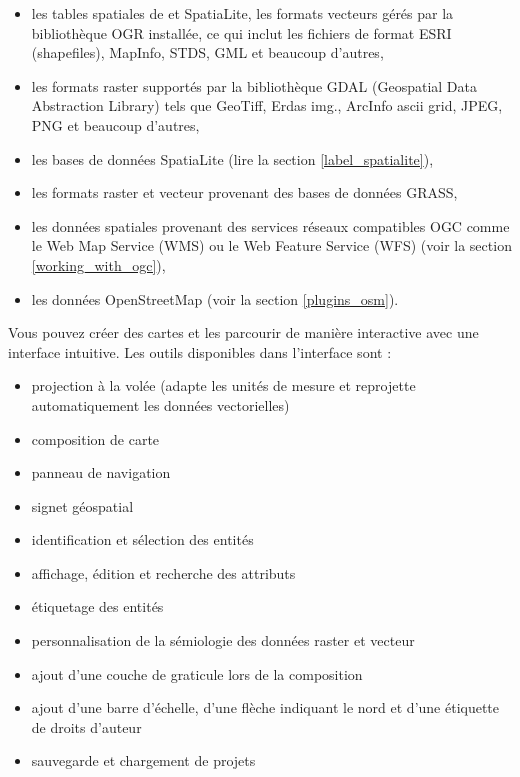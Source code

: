 \begin{itemize}[label=--]
\item les tables spatiales de \ppg et SpatiaLite, les formats vecteurs gérés par la 
bibliothèque OGR installée, ce qui inclut les fichiers de format ESRI (shapefiles),
 MapInfo, STDS, GML et beaucoup d'autres,
\item les formats raster supportés par la bibliothèque GDAL (Geospatial Data 
Abstraction Library) tels que GeoTiff, Erdas img., ArcInfo ascii grid, JPEG, 
PNG et beaucoup d'autres,
\item les bases de données SpatiaLite (lire la section \ref{label_spatialite}),
\item les formats raster et vecteur provenant des bases de données GRASS, 
\item les données spatiales provenant des services réseaux compatibles OGC 
comme le Web Map Service (WMS) ou le Web Feature Service (WFS) (voir la section 
\ref{working_with_ogc}),
\item les données OpenStreetMap (voir la section \ref{plugins_osm}).
\end{itemize}


Vous pouvez créer des cartes et les parcourir de manière interactive avec une 
interface intuitive. Les outils disponibles dans l'interface sont :

\begin{itemize}[label=--]
\item projection à la volée (adapte les unités de mesure et reprojette 
automatiquement les données vectorielles)
\item composition de carte
\item panneau de navigation
\item signet géospatial
\item identification et sélection des entités
\item affichage, édition et recherche des attributs
\item étiquetage des entités
\item personnalisation de la sémiologie des données raster et vecteur
\item ajout d'une couche de graticule lors de la composition
\item ajout d'une barre d'échelle, d'une flèche indiquant le nord et d'une étiquette de droits d'auteur
\item sauvegarde et chargement de projets
\end{itemize}

